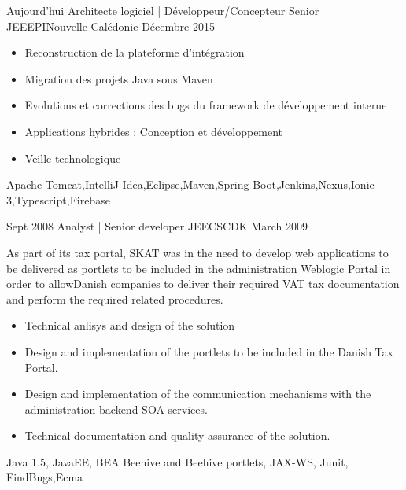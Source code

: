 %
%
%

\begin{experiences}
  \experience
    {Aujourd'hui}   {Architecte logiciel | Développeur/Concepteur Senior JEE}{EPI}{Nouvelle-Calédonie}
    {Décembre 2015} {
                      \begin{itemize}
                        \item Reconstruction de la plateforme d'intégration                        
                        \item Migration des projets Java sous Maven                    
                        \item Evolutions et corrections des bugs du framework de développement interne  
                        \item Applications hybrides : Conception et développement
                        \item Veille technologique                                                                    
                      \end{itemize}
                    }
                    {Apache Tomcat,IntelliJ Idea,Eclipse,Maven,Spring Boot,Jenkins,Nexus,Ionic 3,Typescript,Firebase}

  \emptySeparator

  \experience
    {Sept 2008}     {Analyst | Senior developer JEE}{CSC}{DK}
    {March 2009}    {
    
As part of its tax portal, SKAT was in the need to develop web applications to be delivered as
portlets to be included in the administration Weblogic Portal in order to allowDanish
companies to deliver their required VAT tax documentation and perform the required related
procedures.    
    
                      \begin{itemize}
                        \item Technical anlisys and design of the solution	
                        \item Design and implementation of the portlets to be included in the Danish Tax Portal.	                
                        \item Design and implementation of the communication mechanisms with the administration backend SOA services.
                        \item Technical documentation and quality assurance of the solution.
                      \end{itemize}
                    }
                    {Java 1.5, JavaEE, BEA Beehive and Beehive portlets, JAX-WS, Junit, FindBugs,Ecma}
  

\end{experiences}
